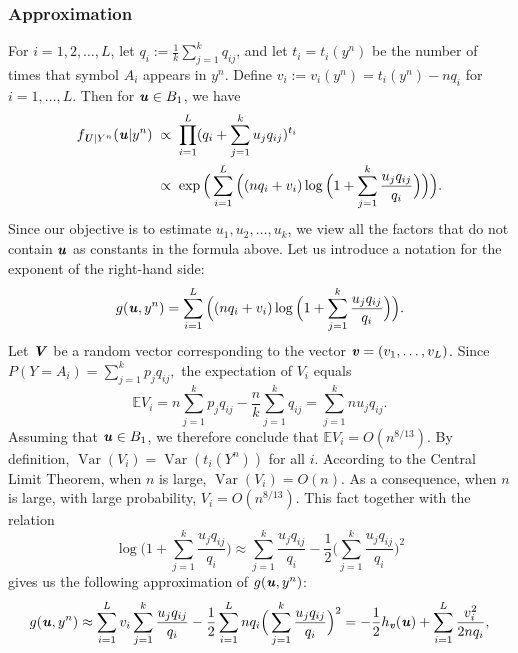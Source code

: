 \documentclass[11pt,onecolumn]{IEEEtran}
\def\mathbi#1{{\textbf{\textit #1}}}
\DeclareMathOperator{\Var}{Var}
\begin{document}
\subsubsection{Approximation}
For $i=1,2,\dots,L$,
let $q_i:=\frac{1}{k}\sum_{j=1}^k q_{ij}$, and let $t_i=t_i(y^n)$ be the number of times that symbol $A_i$ appears in $y^n$. Define $v_i:=v_i(y^n)=t_i(y^n)-n q_i$ for $i=1,\dots,L.$  Then for $\mathbi{u}\in B_1$, we have
   \begin{align}
f_{\mathbi{U}|Y^n}(\mathbi{u}|y^n) &\;\propto\;
\prod_{i=1}^{L} (q_i + \sum_{j=1}^k u_j q_{ij} )^{t_i} \nonumber\\ 
&\;\propto\;
\exp\Big( \sum_{i=1}^L  \Big( (n q_i + v_i)
\log \Big( 1 + \sum_{j=1}^k \frac{u_j q_{ij}}{q_i} \Big) \Big) \Big). \label{eq:f}
    \end{align}
Since our objective is to estimate $u_1,u_2,\dots,u_k$, we view all the factors that {do not contain} $\mathbi{u}$ as constants in the formula above. Let us introduce a notation for the exponent of the right-hand side:
  \begin{equation}\label{eq:g}
g(\mathbi{u},y^n) = \sum_{i=1}^L  \Big( (n q_i + v_i)
\log \Big( 1 + \sum_{j=1}^k \frac{u_j q_{ij}}{q_i} \Big) \Big).
  \end{equation}
Let $\mathbi{V}$ be a random vector corresponding to the vector $\mathbi{v}=(v_1,\dots,v_L)$. Since $P(Y=A_i)=\sum_{j=1}^k p_j q_{ij},$ the expectation of $V_i$ equals
$$
\mathbb{E} V_i = n \sum_{j=1}^k p_j q_{ij}-\frac nk \sum_{j=1}^k q_{ij}=\sum_{j=1}^k n u_j q_{ij}.
$$
Assuming that $\mathbi{u}\in B_1$, we therefore conclude that
$\mathbb{E} V_i = O(n^{8/13})$. By definition, $\Var(V_i)=\Var(t_i(Y^n))$ for all $i$. 
 According to the Central Limit Theorem, when $n$ is large, $\Var(V_i)=O(n)$.
As a consequence, when $n$ is large, with large probability, $V_i = O(n^{8/13})$.
{This fact together with the relation}
  $$
  \log \Big( 1 + \sum_{j=1}^k \frac{u_j q_{ij}}{q_i} \Big)\approx
  \sum_{j=1}^k \frac{u_j q_{ij}}{q_i} - \frac{1}{2}\Big(\sum_{j=1}^k \frac{u_j q_{ij}}{q_i}\Big)^2
  $$
{gives us the following approximation of
$g(\mathbi{u},y^n)$:}
$$
g(\mathbi{u},y^n) \approx %
\sum_{i=1}^L  v_i \sum_{j=1}^k \frac{u_j q_{ij}}{q_i}
-\frac{1}{2} \sum_{i=1}^L  n q_i  \Big(\sum_{j=1}^k \frac{u_j q_{ij}}{q_i} \Big)^2 
 = - \frac{1}{2} h_{\mathbi{v}}(\mathbi{u})
 + \sum_{i=1}^L \frac{v_i^2}{2n q_i},
$$
\end{document}
